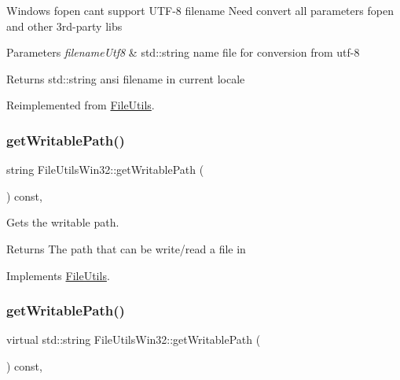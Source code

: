 Windows fopen can\textquotesingle{}t support U\+T\+F-\/8 filename Need convert all parameters fopen and other 3rd-\/party libs


\begin{DoxyParams}{Parameters}
{\em filename\+Utf8} & std\+::string name file for conversion from utf-\/8 \\
\hline
\end{DoxyParams}
\begin{DoxyReturn}{Returns}
std\+::string ansi filename in current locale 
\end{DoxyReturn}


Reimplemented from \hyperlink{classFileUtils_a318996e1e3cc1ff7463dea9159d7e7be}{File\+Utils}.

\mbox{\label{classFileUtilsWin32_a5e9b4cf8f8caa5db5b58606bf8d099b8}} 
\subsubsection{\texorpdfstring{get\+Writable\+Path()}{getWritablePath()}\hspace{0.1cm}{\footnotesize\ttfamily [1/2]}}
{\footnotesize\ttfamily string File\+Utils\+Win32\+::get\+Writable\+Path (\begin{DoxyParamCaption}{ }\end{DoxyParamCaption}) const\hspace{0.3cm}{\ttfamily [override]}, {\ttfamily [virtual]}}

Gets the writable path. \begin{DoxyReturn}{Returns}
The path that can be write/read a file in 
\end{DoxyReturn}


Implements \hyperlink{classFileUtils_aab14c8d4e292f7a1e9b2b2908d02a0ed}{File\+Utils}.

\mbox{\label{classFileUtilsWin32_a7aabbee0edc6ccbb7930de5c23383c54}} 
\subsubsection{\texorpdfstring{get\+Writable\+Path()}{getWritablePath()}\hspace{0.1cm}{\footnotesize\ttfamily [2/2]}}
{\footnotesize\ttfamily virtual std\+::string File\+Utils\+Win32\+::get\+Writable\+Path (\begin{DoxyParamCaption}{ }\end{DoxyParamCaption}) const\hspace{0.3cm}{\ttfamily [override]}, {\ttfamily [virtual]}}

